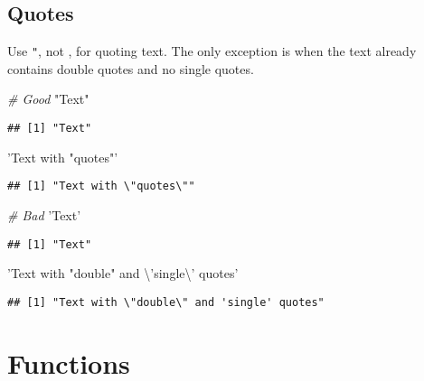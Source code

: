 \documentclass[]{book}
\newenvironment{Shaded}{\begin{snugshade}}{\end{snugshade}}
\newcommand{\CharTok}[1]{\textcolor[rgb]{0.31,0.60,0.02}{{#1}}}
\newcommand{\StringTok}[1]{\textcolor[rgb]{0.31,0.60,0.02}{{#1}}}
\newcommand{\CommentTok}[1]{\textcolor[rgb]{0.56,0.35,0.01}{\textit{{#1}}}}
\begin{document}
\section{Quotes}\label{quotes}

Use \texttt{"}, not \texttt{\textquotesingle{}}, for quoting text. The
only exception is when the text already contains double quotes and no
single quotes.

\begin{Shaded}
\begin{Highlighting}[]
\CommentTok{# Good}
\StringTok{"Text"}
\end{Highlighting}
\end{Shaded}

\begin{verbatim}
## [1] "Text"
\end{verbatim}

\begin{Shaded}
\begin{Highlighting}[]
\StringTok{'Text with "quotes"'}
\end{Highlighting}
\end{Shaded}

\begin{verbatim}
## [1] "Text with \"quotes\""
\end{verbatim}

\begin{Shaded}
\begin{Highlighting}[]
\CommentTok{# Bad}
\StringTok{'Text'}
\end{Highlighting}
\end{Shaded}

\begin{verbatim}
## [1] "Text"
\end{verbatim}

\begin{Shaded}
\begin{Highlighting}[]
\StringTok{'Text with "double" and }\CharTok{\textbackslash{}'}\StringTok{single}\CharTok{\textbackslash{}'}\StringTok{ quotes'}
\end{Highlighting}
\end{Shaded}

\begin{verbatim}
## [1] "Text with \"double\" and 'single' quotes"
\end{verbatim}

\chapter{Functions}\label{style-fun}
\end{document}
